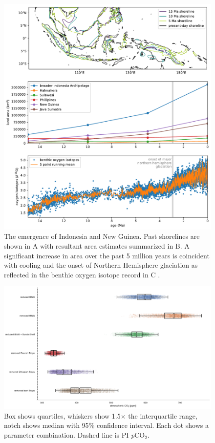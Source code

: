 \documentclass[11pt,letterpaper]{article}
\newcommand{\pCOtwo}{\textit{p}CO$_{2}$\xspace}
\begin{document}
\begin{figure}
    \centering
    \includegraphics[width=1\textwidth]{Manuscript/Figures/shoreline_growth.pdf}
    \caption{The emergence of Indonesia and New Guinea. Past shorelines are shown in A with resultant area estimates summarized in B. A significant increase in area over the past 5 million years is coincident with cooling and the onset of Northern Hemisphere glaciation as reflected in the benthic oxygen isotope record in C \cite{Zachos2008a}.}
    \label{fig:shoreline_growth}
\end{figure}

\begin{figure}
    \centering
    \includegraphics[width=1\textwidth]{Manuscript/Figures/scenario_pCO2.pdf}
    \caption{Box shows quartiles, whiskers show 1.5$\times$ the interquartile range, notch shows median with 95\% confidence interval. Each dot shows a parameter combination. Dashed line is PI \pCOtwo.}
    \label{fig:scenario_pCO2}
\end{figure}

\clearpage
\newpage
\footnotesize

\singlespacing



\end{document}
